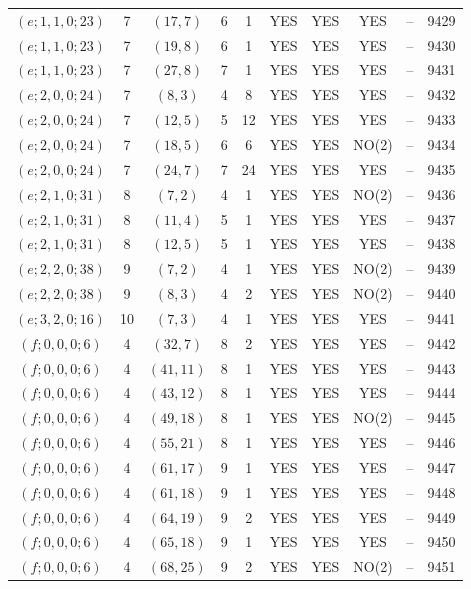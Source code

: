 \begin{longtable}{|c|c|c|c|c|c|c|c|c|c|}
$(e; 1, 1, 0; 23)$ & 7 & $(17, 7)$ & 6 & 1 & YES & YES & YES & -- & 9429\\
$(e; 1, 1, 0; 23)$ & 7 & $(19, 8)$ & 6 & 1 & YES & YES & YES & -- & 9430\\
$(e; 1, 1, 0; 23)$ & 7 & $(27, 8)$ & 7 & 1 & YES & YES & YES & -- & 9431\\
$(e; 2, 0, 0; 24)$ & 7 & $(8, 3)$ & 4 & 8 & YES & YES & YES & -- & 9432\\
$(e; 2, 0, 0; 24)$ & 7 & $(12, 5)$ & 5 & 12 & YES & YES & YES & -- & 9433\\
$(e; 2, 0, 0; 24)$ & 7 & $(18, 5)$ & 6 & 6 & YES & YES & NO(2) & -- & 9434\\
$(e; 2, 0, 0; 24)$ & 7 & $(24, 7)$ & 7 & 24 & YES & YES & YES & -- & 9435\\
$(e; 2, 1, 0; 31)$ & 8 & $(7, 2)$ & 4 & 1 & YES & YES & NO(2) & -- & 9436\\
$(e; 2, 1, 0; 31)$ & 8 & $(11, 4)$ & 5 & 1 & YES & YES & YES & -- & 9437\\
$(e; 2, 1, 0; 31)$ & 8 & $(12, 5)$ & 5 & 1 & YES & YES & YES & -- & 9438\\
$(e; 2, 2, 0; 38)$ & 9 & $(7, 2)$ & 4 & 1 & YES & YES & NO(2) & -- & 9439\\
$(e; 2, 2, 0; 38)$ & 9 & $(8, 3)$ & 4 & 2 & YES & YES & NO(2) & -- & 9440\\
$(e; 3, 2, 0; 16)$ & 10 & $(7, 3)$ & 4 & 1 & YES & YES & YES & -- & 9441\\
$(f; 0, 0, 0; 6)$ & 4 & $(32, 7)$ & 8 & 2 & YES & YES & YES & -- & 9442\\
$(f; 0, 0, 0; 6)$ & 4 & $(41, 11)$ & 8 & 1 & YES & YES & YES & -- & 9443\\
$(f; 0, 0, 0; 6)$ & 4 & $(43, 12)$ & 8 & 1 & YES & YES & YES & -- & 9444\\
$(f; 0, 0, 0; 6)$ & 4 & $(49, 18)$ & 8 & 1 & YES & YES & NO(2) & -- & 9445\\
$(f; 0, 0, 0; 6)$ & 4 & $(55, 21)$ & 8 & 1 & YES & YES & YES & -- & 9446\\
$(f; 0, 0, 0; 6)$ & 4 & $(61, 17)$ & 9 & 1 & YES & YES & YES & -- & 9447\\
$(f; 0, 0, 0; 6)$ & 4 & $(61, 18)$ & 9 & 1 & YES & YES & YES & -- & 9448\\
$(f; 0, 0, 0; 6)$ & 4 & $(64, 19)$ & 9 & 2 & YES & YES & YES & -- & 9449\\
$(f; 0, 0, 0; 6)$ & 4 & $(65, 18)$ & 9 & 1 & YES & YES & YES & -- & 9450\\
$(f; 0, 0, 0; 6)$ & 4 & $(68, 25)$ & 9 & 2 & YES & YES & NO(2) & -- & 9451\\

\end{longtable}
